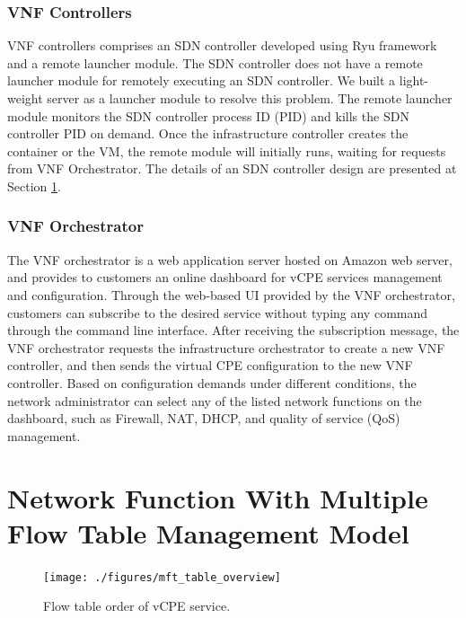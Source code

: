 \documentclass[conference]{IEEEtran}
\begin{document}
\subsubsection{VNF Controllers}
VNF controllers comprises an SDN controller developed using Ryu framework \cite{web:ryu} and a remote launcher module. The SDN controller does not have a remote launcher module for remotely executing an SDN controller. We built a light-weight server as a launcher module to resolve this problem. The remote launcher module monitors the SDN controller process ID (PID) and kills the SDN controller PID on demand. Once the infrastructure controller  creates the container or the VM, the remote module will initially runs, waiting for requests from VNF Orchestrator. The details of an SDN controller design are presented at Section \ref{sec:mft}.

\subsubsection{VNF Orchestrator}
The VNF orchestrator is a web application server hosted on Amazon web server, and provides to customers an online dashboard for vCPE services management and configuration. Through the web-based UI provided by the VNF orchestrator, customers can subscribe to the desired service without typing any command through the command line interface. After receiving the subscription message, the VNF orchestrator requests the infrastructure orchestrator to create a new VNF controller, and then sends the virtual CPE configuration to the new VNF controller. Based on configuration demands under different conditions, the network administrator can select any of the listed network functions on the dashboard, such as Firewall, NAT, DHCP, and quality of service (QoS) management.


\section{Network Function With Multiple Flow Table Management Model} \label{sec:mft}

\begin{figure}[!t]
\centering
\texttt{[image: ./figures/mft\_table\_overview]}
\caption{Flow table order of vCPE service.}
\label{fig:mft_table_overview}
\end{figure}
\end{document}
